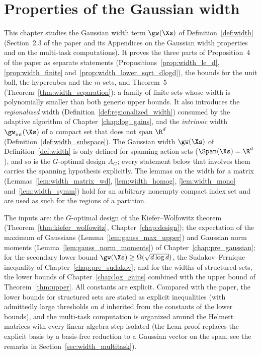 \chapter{Properties of the Gaussian width}
\label{chap:width}

This chapter studies the Gaussian width term $\gw(\Xs)$ of Definition~\ref{def:width}
(Section~2.3 of the paper and its Appendices on the Gaussian width properties and on the
multi-task computations). It proves the three parts of Proposition~4 of the paper as
separate statements (Propositions~\ref{prop:width_le_d}, \ref{prop:width_finite}
and~\ref{prop:width_lower_sqrt_dlogd}), the bounds for the unit ball, the hypercubes and the
$m$-sets, and Theorem~5 (Theorem~\ref{thm:width_separation}): a family of finite sets whose
width is polynomially smaller than both generic upper bounds. It also introduces the
\emph{regionalized} width (Definition~\ref{def:regionalized_width}) consumed by the adaptive
algorithm of Chapter~\ref{chap:log_gains}, and the \emph{intrinsic} width
$\gw_{\mathrm{int}}(\Xs)$ of a compact set that does not span $\R^d$
(Definition~\ref{def:width_subspace}). The Gaussian width $\gw(\Xs)$ of
Definition~\ref{def:width} is only defined for spanning action sets
($\Span(\Xs) = \R^d$), and so is the $G$-optimal design $A_G$; every statement below that
involves them carries the spanning hypothesis explicitly. The lemmas on the width for a
matrix (Lemmas~\ref{lem:width_matrix_wd}, \ref{lem:width_homog}, \ref{lem:width_mono}
and~\ref{lem:width_symm}) hold for an arbitrary nonempty compact index set and are used as
such for the regions of a partition.

The inputs are: the $G$-optimal design of the Kiefer--Wolfowitz theorem
(Theorem~\ref{thm:kiefer_wolfowitz}, Chapter~\ref{chap:design}); the expectation of the
maximum of Gaussians (Lemma~\ref{lem:gauss_max_upper}) and Gaussian norm moments
(Lemma~\ref{lem:gauss_norm_moments}) of Chapter~\ref{chap:pre_gaussian}; for the secondary
lower bound $\gw(\Xs) \ge \Omega(\sqrt{d \log d})$, the Sudakov--Fernique inequality of
Chapter~\ref{chap:pre_sudakov}; and for the widths of structured sets, the lower bounds of
Chapter~\ref{chap:log_gains} combined with the upper bound of Theorem~\ref{thm:upper}. All
constants are explicit. Compared with the paper, the lower bounds for structured sets are
stated as explicit inequalities (with admittedly large thresholds on $d$ inherited from the
constants of the lower bounds), and the multi-task computation is organized around the
Helmert matrices with every linear-algebra step isolated (the Lean proof replaces the explicit
basis by a basis-free reduction to a Gaussian vector on the span, see the remarks in
Section~\ref{sec:width_multitask}).

